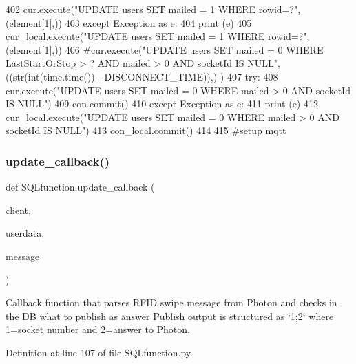 \begin{DoxyCode}
402                 cur.execute(\textcolor{stringliteral}{"UPDATE users SET mailed = 1 WHERE rowid=?"}, (element[1],))
403             \textcolor{keywordflow}{except} Exception \textcolor{keyword}{as} e:
404                 \textcolor{keywordflow}{print} (e)
405             cur\_local.execute(\textcolor{stringliteral}{"UPDATE users SET mailed = 1 WHERE rowid=?"}, (element[1],))
406     \textcolor{comment}{#cur.execute("UPDATE users SET mailed = 0 WHERE LastStartOrStop > ? AND mailed > 0 AND socketId IS
       NULL", ((str(int(time.time()) - DISCONNECT\_TIME)),) ) }
407     \textcolor{keywordflow}{try}:
408         cur.execute(\textcolor{stringliteral}{"UPDATE users SET mailed = 0 WHERE mailed > 0 AND socketId IS NULL"}) 
409         con.commit()
410     \textcolor{keywordflow}{except} Exception \textcolor{keyword}{as} e:
411         \textcolor{keywordflow}{print} (e)
412     cur\_local.execute(\textcolor{stringliteral}{"UPDATE users SET mailed = 0 WHERE mailed > 0 AND socketId IS NULL"}) 
413     con\_local.commit()
414 
415 \textcolor{comment}{#setup mqtt}
\end{DoxyCode}
\mbox{\label{namespace_s_q_lfunction_ae16644514ae2cdbf375884361531f691}} 
\subsubsection{\texorpdfstring{update\+\_\+callback()}{update\_callback()}}
{\footnotesize\ttfamily def S\+Q\+Lfunction.\+update\+\_\+callback (\begin{DoxyParamCaption}\item[{}]{client,  }\item[{}]{userdata,  }\item[{}]{message }\end{DoxyParamCaption})}



Callback function that parses R\+F\+ID swipe message from Photon and checks in the DB what to publish as answer Publish output is structured as \char`\"{}1;2\char`\"{} where 1=socket number and 2=answer to Photon. 



Definition at line 107 of file S\+Q\+Lfunction.\+py.


